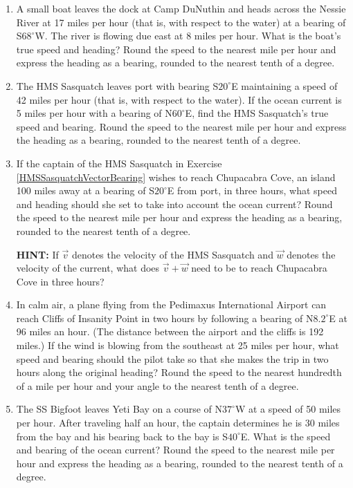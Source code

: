 \documentclass{ximera}
\begin{document}
\begin{enumerate}

\setcounter{enumi}{\value{HW}}

\item A small boat leaves the dock at Camp DuNuthin and heads across the Nessie River at 17 miles per hour (that is, with respect to the water) at a bearing of  S$68^{\circ}$W.   The river is flowing due east at 8 miles per hour.  What is the boat's true speed and heading?  Round the speed to the nearest mile per hour and express the heading as a bearing, rounded to the nearest tenth of a degree.  

\item \label{HMSSasquatchVectorBearing} The HMS Sasquatch leaves port with bearing S$20^{\circ}$E maintaining a speed of 42 miles per hour (that is, with respect to the water).  If the ocean current is 5 miles per hour with a bearing of N$60^{\circ}$E, find the HMS Sasquatch's true speed and bearing.  Round the speed to the nearest mile per hour and express the heading as a bearing, rounded to the nearest tenth of a degree. 

\item If the captain of the HMS Sasquatch in Exercise \ref{HMSSasquatchVectorBearing} wishes to reach Chupacabra Cove, an island 100 miles away at a bearing of  S$20^{\circ}$E from port, in three hours, what speed and heading should she set to take into account the ocean current?   Round the speed to the nearest mile per hour and express the heading as a bearing, rounded to the nearest tenth of a degree.  

\textbf{HINT:}  If $\vec{v}$ denotes the velocity of the HMS Sasquatch and $\vec{w}$ denotes the velocity of the current, what does $\vec{v} + \vec{w}$ need to be to reach Chupacabra Cove in three hours?

\item In calm air, a plane flying from the Pedimaxus International Airport can reach Cliffs of Insanity Point in two hours by following a bearing of N$8.2^{\circ}$E at 96 miles an hour.  (The distance between the airport and the cliffs is 192 miles.)  If the wind is blowing from the southeast at 25 miles per hour, what speed and bearing should the pilot take so that she makes the trip in two hours along the original heading?  Round the speed to the nearest hundredth of a mile per hour and your angle to the nearest tenth of a degree.

\item  The SS Bigfoot leaves Yeti Bay on a course of N$37^{\circ}$W at a speed of 50 miles per hour.  After traveling half an hour, the captain determines he is 30 miles from the bay and his bearing back to the bay is S$40^{\circ}$E.  What is the speed and bearing of the ocean current?  Round the speed to the nearest mile per hour and express the heading as a bearing, rounded to the nearest tenth of a degree.  


\end{enumerate}
\end{document}
